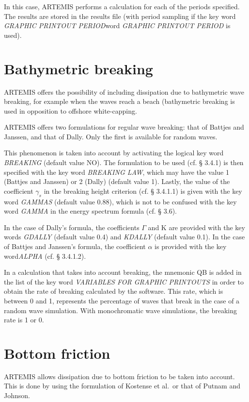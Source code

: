 In this case, ARTEMIS performs a calculation for each of the periods specified.
The results are stored in the results file (with period sampling if the key
word \textit{GRAPHIC PRINTOUT PERIOD}word \textit{GRAPHIC PRINTOUT PERIOD} is
used).


\section{Bathymetric breaking}

ARTEMIS offers the possibility of including dissipation due to bathymetric wave
breaking, for example when the waves reach a beach (bathymetric breaking is
used in opposition to offshore white-capping.

ARTEMIS offers two formulations for regular wave breaking: that of Battjes and
Janssen, and that of Dally. Only the first is available for random waves.

This phenomenon is taken into account by activating the logical key word
\textit{BREAKING} (default value NO). The formulation to be used (cf. {\S}
3.4.1) is then specified with the key word \textit{BREAKING LAW}, which may
have the value 1 (Battjes and Janssen) or 2 (Dally) (default value 1). Lastly,
the value of the coefficient $\gamma_{s}$ in the breaking height criterion (cf.
{\S} 3.4.1.1) is given with the key word \textit{GAMMAS} (default value 0.88),
which is not to be confused with the key word \textit{GAMMA} in the energy
spectrum formula (cf. {\S} 3.6).

In the case of Dally's formula, the coefficients $\Gamma$ and K are provided
with the key words \textit{GDALLY} (default value 0.4) and \textit{KDALLY}
(default value 0.1). In the case of Battjes and Janssen's formula, the
coefficient $\alpha$ is provided with the key word\textit{ALPHA} (cf. {\S}
3.4.1.2).

In a calculation that takes into account breaking, the mnemonic QB is added in
the list of the key word \textit{VARIABLES FOR GRAPHIC PRINTOUTS} in order to
obtain the rate of breaking calculated by the software. This rate, which is
between 0 and 1, represents the percentage of waves that break in the case of a
random wave simulation. With monochromatic wave simulations, the breaking rate
is 1 or 0.


\section{Bottom friction}

ARTEMIS allows dissipation due to bottom friction to be
taken into account. This is done by using the formulation of Kostense et al.\ or
that of Putnam and Johnson.

